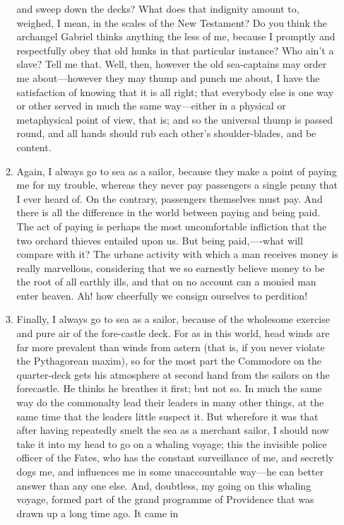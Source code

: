 \documentclass{../armymemo}
\begin{document}
\begin{enumerate}
\begin{enumerate}
    and sweep down the decks? What does that indignity amount to, weighed, I
    mean, in the scales of the New Testament? Do you think the archangel Gabriel
    thinks anything the less of me, because I promptly and respectfully obey
    that old hunks in that particular instance? Who ain’t a slave? Tell me
    that. Well, then, however the old sea-captains may order me about—however
    they may thump and punch me about, I have the satisfaction of knowing that
    it is all right; that everybody else is one way or other served in much the
    same way—either in a physical or metaphysical point of view, that is; and so
    the universal thump is passed round, and all hands should rub each other’s
    shoulder-blades, and be content.
  \item Again, I always go to sea as a sailor, because they make a point of
    paying me for my trouble, whereas they never pay passengers a single penny
    that I ever heard of. On the contrary, passengers themselves must pay. And
    there is all the difference in the world between paying and being paid. The
    act of paying is perhaps the most uncomfortable infliction that the two
    orchard thieves entailed upon us. But being paid,—-what will compare with
    it? The urbane activity with which a man receives money is really
    marvellous, considering that we so earnestly believe money to be the root of
    all earthly ills, and that on no account can a monied man enter heaven. Ah!
    how cheerfully we consign ourselves to perdition!
  \item Finally, I always go to sea as a sailor, because of the wholesome
    exercise and pure air of the fore-castle deck. For as in this world, head
    winds are far more prevalent than winds from astern (that is, if you never
    violate the Pythagorean maxim), so for the most part the Commodore on the
    quarter-deck gets his atmosphere at second hand from the sailors on the
    forecastle. He thinks he breathes it first; but not so. In much the same way
    do the commonalty lead their leaders in many other things, at the same time
    that the leaders little suspect it. But wherefore it was that after having
    repeatedly smelt the sea as a merchant sailor, I should now take it into my
    head to go on a whaling voyage; this the invisible police officer of the
    Fates, who has the constant surveillance of me, and secretly dogs me, and
    influences me in some unaccountable way—he can better answer than any one
    else. And, doubtless, my going on this whaling voyage, formed part of the
    grand programme of Providence that was drawn up a long time ago. It came in

\end{enumerate}
\end{enumerate}
\end{document}
